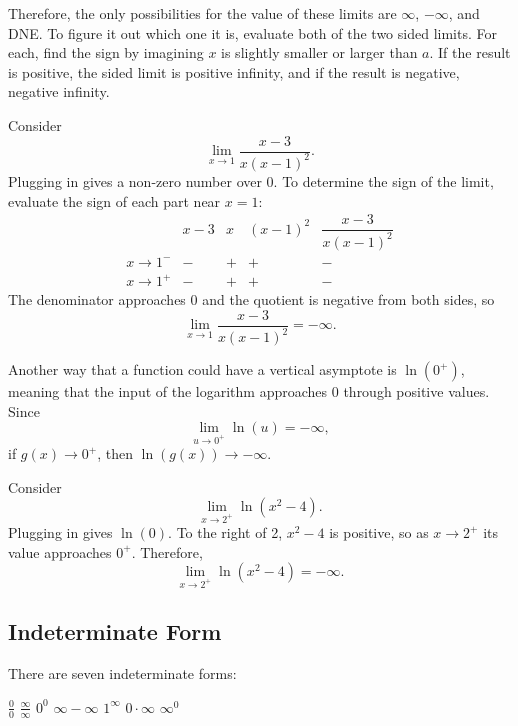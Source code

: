 Therefore, the only possibilities for the value of these limits are $\infty$, $-\infty$, and DNE.  To figure it out which one it is, evaluate both of the two sided limits. For each, find the sign by imagining $x$ is slightly smaller or larger than $a$. If the result is positive, the sided limit is positive infinity, and if the result is negative, negative infinity.

\begin{exampleblock}
Consider
$$\lim_{x\to1}\frac{x-3}{x(x-1)^2}.$$
Plugging in gives a non-zero number over 0. To determine the sign of the limit, evaluate the sign of each part near $x=1$:
$$
\begin{array}{c|ccc|c}
 & x-3 & x & (x-1)^2 & \dfrac{x-3}{x(x-1)^2}\\
\hline
x\to1^- & - & + & + & -\\
x\to1^+ & - & + & + & -
\end{array}
$$
The denominator approaches 0 and the quotient is negative from both sides, so
$$\lim_{x\to1}\frac{x-3}{x(x-1)^2}=-\infty.$$
\end{exampleblock}

Another way that a function could have a vertical asymptote is $\ln(0^+)$, meaning that the input of the logarithm approaches 0 through positive values. Since
$$\lim_{u\to0^+}\ln(u)=-\infty,$$
if $g(x)\to0^+$, then $\ln(g(x))\to-\infty$.

\begin{exampleblock}
Consider
$$\lim_{x\to2^+}\ln(x^2-4).$$
Plugging in gives $\ln(0)$. To the right of 2, $x^2-4$ is positive, so as $x\to2^+$ its value approaches $0^+$. Therefore,
$$\lim_{x\to2^+}\ln(x^2-4)=-\infty.$$
\end{exampleblock}

\subsection{Indeterminate Form}

There are seven indeterminate forms:

\vspace{1em}

\begin{center}
\begin{Large}
\phantom{}\hfill
$\frac{0}{0}$ \hfill
$\frac{\infty}{\infty}$ \hfill
$0^0$ \hfill
$\infty{-}\infty$ \hfill
$1^\infty$ \hfill
$0{\cdot}\infty$ \hfill
$\infty^0$
\hfill\phantom{}
\end{Large}
\end{center}

